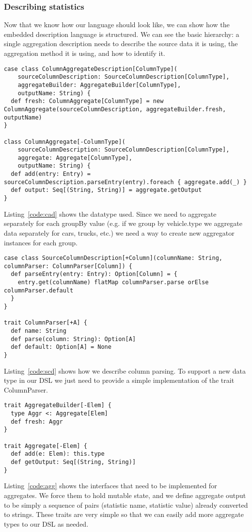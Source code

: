 \subsubsection{Describing statistics}
Now that we know how our language should look like, we can show how the embedded description language is structured.
We can see the basic hierarchy: a single aggregation description needs to describe the source data it is using, the aggregation method it is using, and how to identify it.
\begin{lstlisting}[caption=ColumnAggregateDescription, label=code:cad]
case class ColumnAggregateDescription[ColumnType](
    sourceColumnDescription: SourceColumnDescription[ColumnType],
    aggregateBuilder: AggregateBuilder[ColumnType],
    outputName: String) {
  def fresh: ColumnAggregate[ColumnType] = new ColumnAggregate(sourceColumnDescription, aggregateBuilder.fresh, outputName)
}

class ColumnAggregate[-ColumnType](
    sourceColumnDescription: SourceColumnDescription[ColumnType],
    aggregate: Aggregate[ColumnType],
    outputName: String) {
  def add(entry: Entry) = sourceColumnDescription.parseEntry(entry).foreach { aggregate.add(_) }
  def output: Seq[(String, String)] = aggregate.getOutput
}
\end{lstlisting}
Listing~\ref{code:cad} shows the datatype used.
Since we need to aggregate separately for each groupBy value (e.g. if we group by vehicle.type we aggregate data separately for cars, trucks, etc.) we need a way to create new aggregator instances for each group.

\begin{lstlisting}[caption=SourceColumnDescription, label=code:scd]
case class SourceColumnDescription[+Column](columnName: String, columnParser: ColumnParser[Column]) {
  def parseEntry(entry: Entry): Option[Column] = {
    entry.get(columnName) flatMap columnParser.parse orElse columnParser.default
  }
}

trait ColumnParser[+A] {
  def name: String
  def parse(column: String): Option[A]
  def default: Option[A] = None
}
\end{lstlisting}
Listing~\ref{code:scd} shows how we describe column parsing.
To support a new data type in our DSL we just need to provide a simple implementation of the trait ColumnParser.

\begin{lstlisting}[caption=Aggregate, label=code:agg, float, floatplacement=H]
trait AggregateBuilder[-Elem] {
  type Aggr <: Aggregate[Elem]
  def fresh: Aggr
}

trait Aggregate[-Elem] {
  def add(e: Elem): this.type
  def getOutput: Seq[(String, String)]
}
\end{lstlisting}
Listing~\ref{code:agg} shows the interfaces that need to be implemented for aggregates.
We force them to hold mutable state, and we define aggregate output to be simply a sequence of pairs (statistic name, statistic value) already converted to strings.
These traits are very simple so that we can easily add more aggregate types to our DSL as needed.

